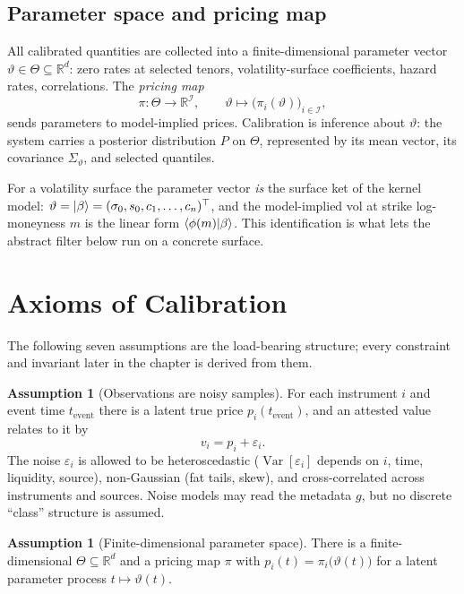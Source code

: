 \documentclass[11pt]{book}
\theoremstyle{plain}
\theoremstyle{definition}
\newtheorem{assumption}[theorem]{Assumption}
\theoremstyle{remark}
\newcommand{\ket}[1]{\mathinner{\lvert #1 \rangle}}
\newcommand{\braket}[1]{\mathinner{\langle #1 \rangle}}
\newcommand{\parket}{\ket{\beta}}                %
\newcommand{\mln}{m}                             %
\newcommand{\parvec}{\vartheta}                  %
\newcommand{\Var}{\operatorname{Var}}
\begin{document}
\subsection{Parameter space and pricing map}

All calibrated quantities are collected into a finite-dimensional parameter
vector $\parvec\in\Theta\subseteq\mathbb{R}^d$: zero rates at selected tenors,
volatility-surface coefficients, hazard rates, correlations. The \emph{pricing
map}
\[
    \pi:\Theta\to\mathbb{R}^{\mathcal{I}},
    \qquad \parvec\mapsto\bigl(\pi_i(\parvec)\bigr)_{i\in\mathcal{I}},
\]
sends parameters to model-implied prices. Calibration is inference about
$\parvec$: the system carries a posterior distribution $P$ on $\Theta$,
represented by its mean vector, its covariance $\Sigma_\parvec$, and
selected quantiles.

For a volatility surface the parameter vector \emph{is} the surface ket of the
kernel model: $\parvec=\parket=(\sigma_0,s_0,c_1,\dots,c_n)^{\top}$, and the
model-implied vol at strike log-moneyness $\mln$ is the linear form
$\braket{\phi(\mln)|\beta}$. This identification is what lets the abstract filter
below run on a concrete surface.

\section{Axioms of Calibration}

The following seven assumptions are the load-bearing structure; every constraint
and invariant later in the chapter is derived from them.

\begin{assumption}[Observations are noisy samples]
\label{ax:A1}
For each instrument $i$ and event time $t_{\text{event}}$ there is a latent true
price $p_i(t_{\text{event}})$, and an attested value relates to it by
\[
    v_i = p_i + \varepsilon_i .
\]
The noise $\varepsilon_i$ is allowed to be heteroscedastic
($\Var[\varepsilon_i]$ depends on $i$, time, liquidity, source), non-Gaussian
(fat tails, skew), and cross-correlated across instruments and sources. Noise
models may read the metadata $g$, but no discrete ``class'' structure is assumed.
\end{assumption}

\begin{assumption}[Finite-dimensional parameter space]
\label{ax:A2}
There is a finite-dimensional $\Theta\subseteq\mathbb{R}^d$ and a pricing map
$\pi$ with $p_i(t)=\pi_i\bigl(\parvec(t)\bigr)$ for a latent parameter process
$t\mapsto\parvec(t)$.
\end{assumption}
\end{document}
